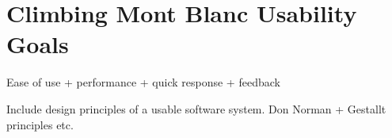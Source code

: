 \chapter{Climbing Mont Blanc Usability Goals}

Ease of use + performance + quick response + feedback

Include design principles of a usable software system. Don Norman + Gestallt principles etc.
